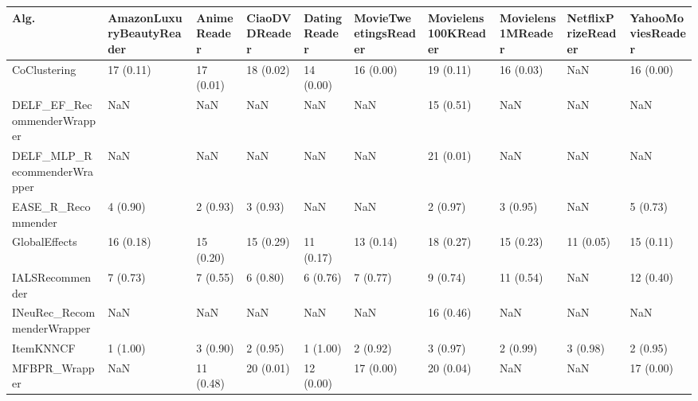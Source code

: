 \begin{tabular}{llllllllll}
\toprule
                               Alg. & AmazonLuxuryBeautyReader & AnimeReader & CiaoDVDReader & DatingReader & MovieTweetingsReader & Movielens100KReader & Movielens1MReader & NetflixPrizeReader & YahooMoviesReader \\
\midrule
                       CoClustering &                17 (0.11) &   17 (0.01) &     18 (0.02) &    14 (0.00) &            16 (0.00) &           19 (0.11) &         16 (0.03) &                NaN &         16 (0.00) \\
         DELF\_EF\_RecommenderWrapper &                      NaN &         NaN &           NaN &          NaN &                  NaN &           15 (0.51) &               NaN &                NaN &               NaN \\
        DELF\_MLP\_RecommenderWrapper &                      NaN &         NaN &           NaN &          NaN &                  NaN &           21 (0.01) &               NaN &                NaN &               NaN \\
                 EASE\_R\_Recommender &                 4 (0.90) &    2 (0.93) &      3 (0.93) &          NaN &                  NaN &            2 (0.97) &          3 (0.95) &                NaN &          5 (0.73) \\
                      GlobalEffects &                16 (0.18) &   15 (0.20) &     15 (0.29) &    11 (0.17) &            13 (0.14) &           18 (0.27) &         15 (0.23) &          11 (0.05) &         15 (0.11) \\
                    IALSRecommender &                 7 (0.73) &    7 (0.55) &      6 (0.80) &     6 (0.76) &             7 (0.77) &            9 (0.74) &         11 (0.54) &                NaN &         12 (0.40) \\
         INeuRec\_RecommenderWrapper &                      NaN &         NaN &           NaN &          NaN &                  NaN &           16 (0.46) &               NaN &                NaN &               NaN \\
                          ItemKNNCF &                 1 (1.00) &    3 (0.90) &      2 (0.95) &     1 (1.00) &             2 (0.92) &            3 (0.97) &          2 (0.99) &           3 (0.98) &          2 (0.95) \\
                      MFBPR\_Wrapper &                      NaN &   11 (0.48) &     20 (0.01) &    12 (0.00) &            17 (0.00) &           20 (0.04) &               NaN &                NaN &         17 (0.00) \\

\end{tabular}
